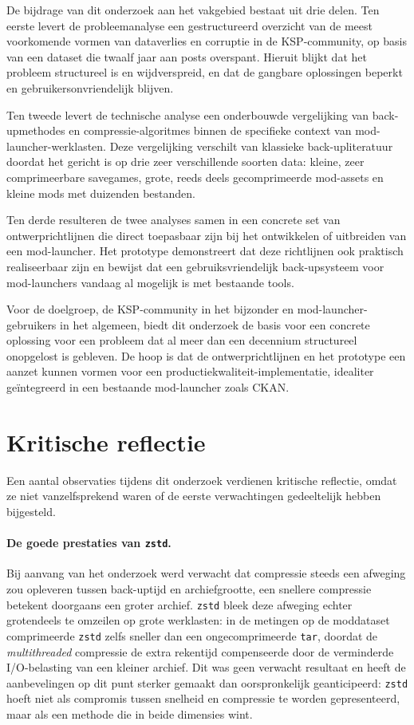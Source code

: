 De bijdrage van dit onderzoek aan het vakgebied bestaat uit drie delen. Ten eerste levert de probleemanalyse een gestructureerd overzicht van de meest voorkomende vormen van dataverlies en corruptie in de KSP-community, op basis van een dataset die twaalf jaar aan posts overspant. Hieruit blijkt dat het probleem structureel is en wijdverspreid, en dat de gangbare oplossingen beperkt en gebruikersonvriendelijk blijven.

Ten tweede levert de technische analyse een onderbouwde vergelijking van back-upmethodes en compressie-algoritmes binnen de specifieke context van mod-launcher-werklasten. Deze vergelijking verschilt van klassieke back-upliteratuur doordat het gericht is op drie zeer verschillende soorten data: kleine, zeer comprimeerbare savegames, grote, reeds deels gecomprimeerde mod-assets en kleine mods met duizenden bestanden.

Ten derde resulteren de twee analyses samen in een concrete set van ontwerprichtlijnen die direct toepasbaar zijn bij het ontwikkelen of uitbreiden van een mod-launcher. Het prototype demonstreert dat deze richtlijnen ook praktisch realiseerbaar zijn en bewijst dat een gebruiksvriendelijk back-upsysteem voor mod-launchers vandaag al mogelijk is met bestaande tools.

Voor de doelgroep, de KSP-community in het bijzonder en mod-launcher-gebruikers in het algemeen, biedt dit onderzoek de basis voor een concrete oplossing voor een probleem dat al meer dan een decennium structureel onopgelost is gebleven. De hoop is dat de ontwerprichtlijnen en het prototype een aanzet kunnen vormen voor een productiekwaliteit-implementatie, idealiter geïntegreerd in een bestaande mod-launcher zoals CKAN.


\section{Kritische reflectie}
\label{sec:concl-reflectie}

Een aantal observaties tijdens dit onderzoek verdienen kritische reflectie, omdat ze niet vanzelfsprekend waren of de eerste verwachtingen gedeeltelijk hebben bijgesteld.

\paragraph{De goede prestaties van \texttt{zstd}.}
Bij aanvang van het onderzoek werd verwacht dat compressie steeds een afweging zou opleveren tussen back-uptijd en archiefgrootte, een snellere compressie betekent doorgaans een groter archief. \texttt{zstd} bleek deze afweging echter grotendeels te omzeilen op grote werklasten: in de metingen op de moddataset comprimeerde \texttt{zstd} zelfs sneller dan een ongecomprimeerde \texttt{tar}, doordat de \textit{multithreaded} compressie de extra rekentijd compenseerde door de verminderde I/O-belasting van een kleiner archief. Dit was geen verwacht resultaat en heeft de aanbevelingen op dit punt sterker gemaakt dan oorspronkelijk geanticipeerd: \texttt{zstd} hoeft niet als compromis tussen snelheid en compressie te worden gepresenteerd, maar als een methode die in beide dimensies wint.

